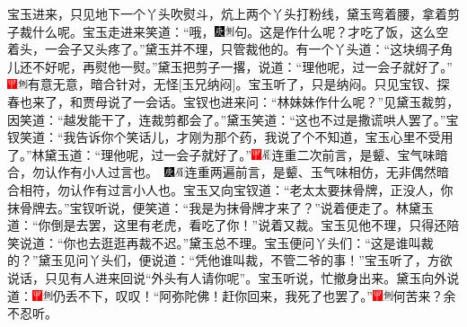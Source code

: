 宝玉进来，只见地下一个丫头吹熨斗，炕上两个丫头打粉线，黛玉弯着腰，拿着剪子裁什么呢。宝玉走进来笑道：``哦，{\includegraphics[width=3mm]{../Images/00004}\includegraphics[width=3mm]{../Images/00011}\footnotesize \kaishu 句。}这是作什么呢？才吃了饭，这么空着头，一会子又头疼了。''黛玉并不理，只管裁他的。有一个丫头道：``这块绸子角儿还不好呢，再熨他一熨。''黛玉把剪子一撂，说道：``理他呢，过一会子就好了。''{\includegraphics[width=3mm]{../Images/00002}\includegraphics[width=3mm]{../Images/00011}\footnotesize \kaishu 有意无意，暗合针对，无怪{[}玉兄纳闷{]}。}宝玉听了，只是纳闷。只见宝钗、探春也来了，和贾母说了一会话。宝钗也进来问：``林妹妹作什么呢？''见黛玉裁剪，因笑道：``越发能干了，连裁剪都会了。''黛玉笑道：``这也不过是撒谎哄人罢了。''宝钗笑道：``我告诉你个笑话儿，才刚为那个药，我说了个不知道，宝玉心里不受用了。''林黛玉道：``理他呢，过一会子就好了。''{\includegraphics[width=3mm]{../Images/00002}\includegraphics[width=3mm]{../Images/00010}\footnotesize \kaishu 连重二次前言，是颦、宝气味暗合，勿认作有小人过言也。　\includegraphics[width=3mm]{../Images/00004}\includegraphics[width=3mm]{../Images/00010}\footnotesize \kaishu 连重两遍前言，是颦、玉气味相仿，无非偶然暗合相符，勿认作有过言小人也。}宝玉又向宝钗道：``老太太要抹骨牌，正没人，你抹骨牌去。''宝钗听说，便笑道：``我是为抹骨牌才来了？''说着便走了。林黛玉道：``你倒是去罢，这里有老虎，看吃了你！''说着又裁。宝玉见他不理，只得还陪笑说道：``你也去逛逛再裁不迟。''黛玉总不理。宝玉便问丫头们：``这是谁叫裁的？''黛玉见问丫头们，便说道：``凭他谁叫裁，不管二爷的事！''宝玉听了，方欲说话，只见有人进来回说``外头有人请你呢''。宝玉听说，忙撤身出来。黛玉向外说道：{\includegraphics[width=3mm]{../Images/00002}\includegraphics[width=3mm]{../Images/00011}\footnotesize \kaishu 仍丢不下，叹叹！}``阿弥陀佛！赶你回来，我死了也罢了。''{\includegraphics[width=3mm]{../Images/00002}\includegraphics[width=3mm]{../Images/00011}\footnotesize \kaishu 何苦来？余不忍听。}

